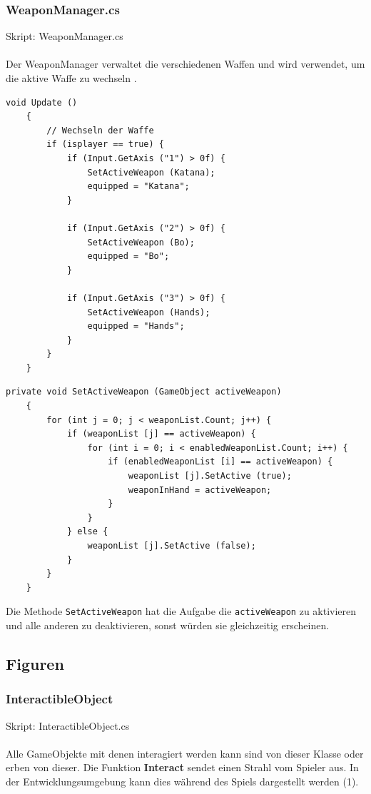 \subsubsection{WeaponManager.cs}
Skript: WeaponManager.cs\\\\
Der WeaponManager verwaltet die verschiedenen Waffen und wird verwendet, um die aktive Waffe zu wechseln .

\begin{lstlisting}[caption={Wechsel der Waffen ja nach Taste}]
	void Update ()
	{
		// Wechseln der Waffe
		if (isplayer == true) {
			if (Input.GetAxis ("1") > 0f) {
				SetActiveWeapon (Katana);
				equipped = "Katana";
			}

			if (Input.GetAxis ("2") > 0f) {
				SetActiveWeapon (Bo);
				equipped = "Bo";
			}

			if (Input.GetAxis ("3") > 0f) {
				SetActiveWeapon (Hands);
				equipped = "Hands";
			}
		}
	}
\end{lstlisting}

\begin{lstlisting}[caption={Aktivieren einer Waffe}]
	private void SetActiveWeapon (GameObject activeWeapon)
	{
		for (int j = 0; j < weaponList.Count; j++) {
			if (weaponList [j] == activeWeapon) {
				for (int i = 0; i < enabledWeaponList.Count; i++) {
					if (enabledWeaponList [i] == activeWeapon) {
						weaponList [j].SetActive (true);
						weaponInHand = activeWeapon;
					}
				}
			} else {
				weaponList [j].SetActive (false);
			}
		}
	}
\end{lstlisting}

Die Methode \lstinline{SetActiveWeapon} hat die Aufgabe die \lstinline{activeWeapon} zu aktivieren und alle anderen zu deaktivieren, sonst würden sie gleichzeitig erscheinen.

\subsection{Figuren}

\subsubsection{InteractibleObject}
\label{subsubsec:interactibleobject}
Skript: InteractibleObject.cs\\\\
Alle GameObjekte mit denen interagiert werden kann sind von dieser Klasse oder erben von dieser.
Die Funktion \textbf{Interact} sendet einen Strahl vom Spieler aus. In der Entwicklungsumgebung kann dies während des Spiels dargestellt werden (1).

